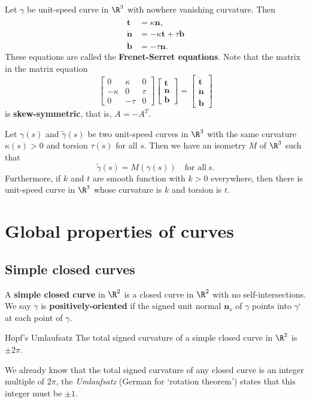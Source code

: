\begin{theorem}
   Let $\gamma $ be unit-speed curve in $\R^3$ with nowhere vanishing curvature. Then 
   \begin{align*}
   \dot{\mathbf t}&=\kappa\mathbf n,\\
   \dot{\mathbf n}&=-\kappa\mathbf t+\tau \mathbf b\\
   \dot{\mathbf b}&=-\tau \mathbf n.
   \end{align*}These equations are called the \textbf{Frenet-Serret equations}. Note that the matrix in the matrix equation \[
   \begin{bmatrix}
       0 & \kappa & 0 \\ -\kappa & 0 & \tau \\ 0 & -\tau & 0
   \end{bmatrix} 
   \begin{bmatrix}
       \mathbf t \\ \mathbf n \\ \mathbf b
   \end{bmatrix}=
   \begin{bmatrix}
       \dot{\mathbf t} \\ \dot {\mathbf n} \\ \dot{\mathbf b} 
   \end{bmatrix}
   \] is \textbf{skew-symmetric}, that is, $A=-A^T$.
\end{theorem} 
\begin{theorem}
    Let $\gamma (s)$ and $\widetilde \gamma (s)$ be two unit-speed curves in $\R^3$ with the same curvature $\kappa(s)>0$ and torsion $\tau(s)$ for all $s$. Then we have an isometry $M$ of $\R^3$ such that \[
        \widetilde \gamma (s)=M(\gamma (s)) \quad \text{for all} \ s.
    \] Furthermore, if $k$ and $t$ are smooth function with $k>0$ everywhere, then there is unit-speed curve in $\R^3$ whose curvature is $k$ and torsion is $t$.
\end{theorem}

\section{Global properties of curves} 
\subsection{Simple closed curves}
\begin{definition}[]
    A \textbf{simple closed curve} in $\R^2$ is a closed curve in $\R^2$ with no self-intersections. We say $\gamma $ is \textbf{positively-oriented} if the signed unit normal $\mathbf n_s$ of $\gamma $ points into $\gamma ^{\circ}$ at each point of $\gamma $.
\end{definition}
\begin{namedthm}{Hopf's Umlaufsatz} 
   The total signed curvature of a simple closed curve in $\R^2$ is $\pm 2\pi$. 
\end{namedthm}
We already know that the total signed curvature of any closed curve is an integer multiple of $2\pi$, the \emph{Umlaufsatz} (German for `rotation theorem') states that this integer must be $\pm 1$.

